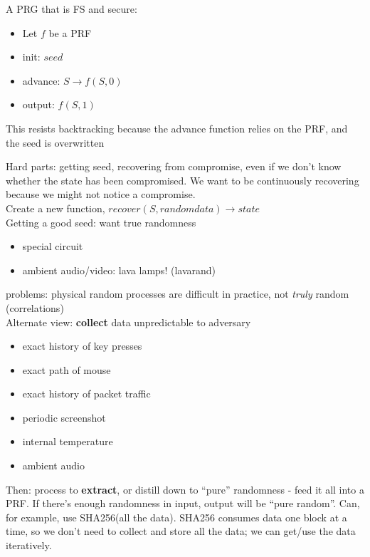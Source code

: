\begin{example}{A PRG that is FS and secure:}
    \begin{itemize}
    \item Let $f$ be a PRF
    \item init: $seed$
    \item advance: $S \rightarrow f(S, 0)$
    \item output: $f(S, 1)$
    \end{itemize}
    This resists backtracking because the advance function relies on the PRF, and the seed is overwritten
\end{example}

Hard parts: getting seed, recovering from compromise, even if we don't know whether the state has been compromised. We want to be continuously recovering because we might not notice a compromise.\\
Create a new function, $recover(S, random data) \rightarrow state$\\

Getting a good seed: want true randomness
\begin{itemize}
    \item special circuit
    \item ambient audio/video: lava lamps! (lavarand)
\end{itemize}
problems: physical random processes are difficult in practice, not \emph{truly} random (correlations)\\

Alternate view: \textbf{collect} data unpredictable to adversary
\begin{itemize}
    \item exact history of key presses
    \item exact path of mouse
    \item exact history of packet traffic
    \item periodic screenshot
    \item internal temperature
    \item ambient audio
\end{itemize}


Then: process to \textbf{extract}, or distill down to ``pure''
randomness - feed it all into a PRF. If there's enough randomness in
input, output will be ``pure random''.  Can, for example, use
SHA256(all the data). SHA256 consumes data one block at a time, so we don't 
need to collect and store all the data; we can get/use the data iteratively.\\


